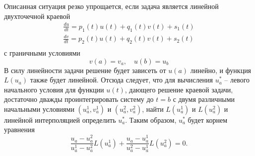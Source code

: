 \documentclass[../../calc-math-exam-2023.tex]{subfiles}
\begin{document}
    Описанная ситуация резко упрощается, если задача является линейной двухточечной краевой
    \begin{gather*}
        \frac{du}{dt} = p_1(t)u(t) + q_1(t)v(t) + s_1(t)\\
        \frac{dv}{dt} = p_2(t)u(t) + q_2(t)v(t) + s_2(t)\\
    \end{gather*}
    с граничными условиями
    \begin{equation*}
        v(a) = v_a, \quad u(b) = u_b
    \end{equation*}
    В силу линейности задачи решение будет зависеть от $u(a)$ линейно, и функция $\displaystyle L(u_a)$ также будет
    линейной. Отсюда следует, что для вычисления $\displaystyle u_a^*$ -- левого начального условия для функции $u(t)$,
    дающего решение краевой задачи, достаточно дважды проинтегрировать систему до $t = b$ с двумя различными начальными
    условиями $\displaystyle (u_a^1, v_a^1)$ и $\displaystyle (u_a^2, v_a^2)$, найти $\displaystyle L\left( u_a^1 \right)$
    и $\displaystyle L \left( u_a^2 \right)$ и линейной интерполяцией определить $\displaystyle u_a^*$. Таким образом,
    $\displaystyle u_a^*$ будет корнем уравнения
    \begin{equation*}
        \frac{u_a - u_a^2}{u_a^1 - u_a^2}L\left( u_a^1 \right) + \frac{u_a - u_a^1}{u_a^2 - u_a^1}L\left( u_a^2 \right) = 0.
    \end{equation*}
\end{document}
